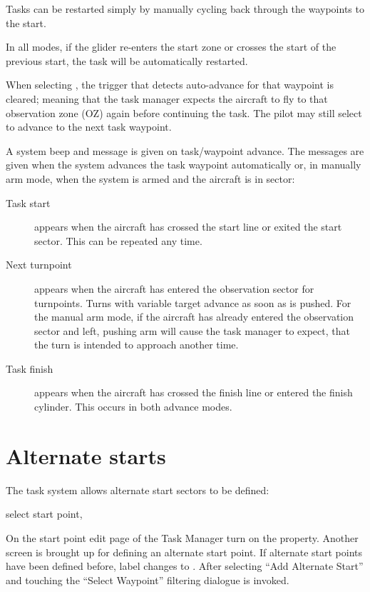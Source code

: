 \tip{} Tasks can be restarted simply by manually cycling back through the
waypoints to the start.

In all modes, if the glider re-enters the start zone or crosses the
start of the previous start, the task will be automatically restarted. 

When selecting , the trigger that detects
auto-advance for that waypoint is cleared; meaning that the task
manager expects the aircraft to fly to that observation zone (OZ)
again before continuing the task. The pilot may still select  to advance to the next task waypoint.

A system beep and message is given on task/waypoint advance.  The
messages are given when the system advances the task waypoint
automatically or, in manually arm mode, when the system is armed and the
aircraft is in sector:
\begin{description}
\item[Task start]  appears when the aircraft has crossed the start line or
 exited the start sector. This can be repeated any time.
\item[Next turnpoint]  appears when the aircraft has entered the observation
 sector for turnpoints. Turns with variable target advance as soon as
  is pushed.  For the manual arm mode, if the
 aircraft has already entered the observation sector and left, pushing arm will
 cause the task manager to expect, that the turn is intended to approach
 another time.
\item[Task finish]  appears when the aircraft has crossed the finish line
 or entered the finish cylinder.  This occurs in both advance modes. 
\end{description}


\section{Alternate starts}\label{sec:alternate-starts}

The task system allows alternate start sectors to be defined:

\blink{} select start point, \blink{}

On the start point edit page of the Task Manager turn on the  property. Another screen is brought up for defining an 
alternate start point. If alternate start points have been defined before, label  changes to . After selecting ``Add Alternate Start'' and touching
 the ``Select Waypoint'' filtering dialogue is invoked.

